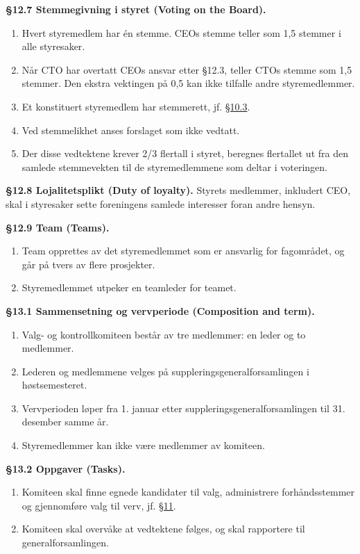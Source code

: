 \documentclass{../../../Common/Latex/Templates/rapport}
\begin{document}
\textbf{\S 12.7 Stemmegivning i styret (Voting on the Board).}\label{bylaw:12.7}
\begin{enumerate}
  \item Hvert styremedlem har én stemme. CEOs stemme teller som 1,5 stemmer i alle styresaker.
  \item Når CTO har overtatt CEOs ansvar etter \S12.3, teller CTOs stemme som 1,5 stemmer. Den ekstra vektingen på 0,5 kan ikke tilfalle andre styremedlemmer.
  \item Et konstituert styremedlem har stemmerett, jf. \hyperref[bylaw:10.3]{\S 10.3}.
  \item Ved stemmelikhet anses forslaget som ikke vedtatt.
  \item Der disse vedtektene krever 2/3 flertall i styret, beregnes flertallet ut fra den samlede stemmevekten til de styremedlemmene som deltar i voteringen.
\end{enumerate}

\textbf{\S 12.8 Lojalitetsplikt (Duty of loyalty).}\label{bylaw:12.8} Styrets medlemmer, inkludert CEO, skal i styresaker sette foreningens samlede interesser foran andre hensyn.

\textbf{\S 12.9 Team (Teams).}\label{bylaw:12.9}
\begin{enumerate}
  \item Team opprettes av det styremedlemmet som er ansvarlig for fagområdet, og går på tvers av flere prosjekter.
  \item Styremedlemmet utpeker en teamleder for teamet.
\end{enumerate}

\label{bylaw:13}
\textbf{\S 13.1 Sammensetning og vervperiode (Composition and term).}\label{bylaw:13.1}
\begin{enumerate}
  \item Valg- og kontrollkomiteen består av tre medlemmer: en leder og to medlemmer.
  \item Lederen og medlemmene velges på suppleringsgeneralforsamlingen i høstsemesteret.
  \item Vervperioden løper fra 1. januar etter suppleringsgeneralforsamlingen til 31. desember samme år.
  \item Styremedlemmer kan ikke være medlemmer av komiteen.
\end{enumerate}

\textbf{\S 13.2 Oppgaver (Tasks).}\label{bylaw:13.2}
\begin{enumerate}
  \item Komiteen skal finne egnede kandidater til valg, administrere forhåndsstemmer og gjennomføre valg til verv, jf. \hyperref[bylaw:11]{\S 11}.
  \item Komiteen skal overvåke at vedtektene følges, og skal rapportere til generalforsamlingen.
\end{enumerate}
\end{document}
